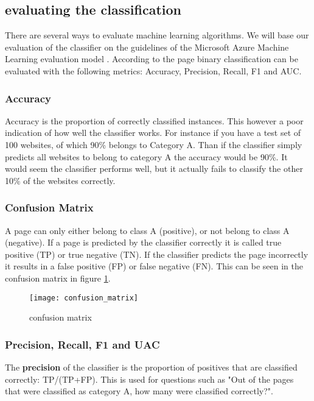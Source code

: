 \subsection{evaluating the classification}
There are several ways to evaluate machine learning algorithms. We will base our evaluation of the classifier on the guidelines of the Microsoft Azure Machine Learning evaluation model \cite{EvualteML}. According to the page binary classification can be evaluated with the following metrics: Accuracy, Precision, Recall, F1 and AUC.

\subsubsection{Accuracy}
Accuracy is the proportion of correctly classified instances. This however a poor indication of how well the classifier works. For instance if you have a test set of 100 websites, of which 90\% belongs to Category A. Than if the classifier simply predicts all websites to belong to category A the accuracy would be 90\%. It would seem the classifier performs well, but it actually fails to classify the other 10\% of the websites correctly.

\subsubsection{Confusion Matrix}
A page can only either belong to class A (positive), or not belong to class A (negative). If a page is predicted by the classifier correctly it is called true positive (TP) or true negative (TN). If the classifier predicts the page incorrectly it results in a false positive (FP) or false negative (FN). This can be seen in the confusion matrix in figure \ref{fig:confusion_matrix}. 

\begin{figure}[h]
\centering
\texttt{[image: confusion\_matrix]}
\caption{confusion matrix \protect\footnotemark{}}
\label{fig:confusion_matrix}
\end{figure}


\subsubsection{Precision, Recall, F1 and UAC}
The \textbf{precision} of the classifier is the proportion of positives that are classified correctly: TP/(TP+FP). This is used for questions such as "Out of the pages that were classified as category A, how many were classified correctly?".\\

